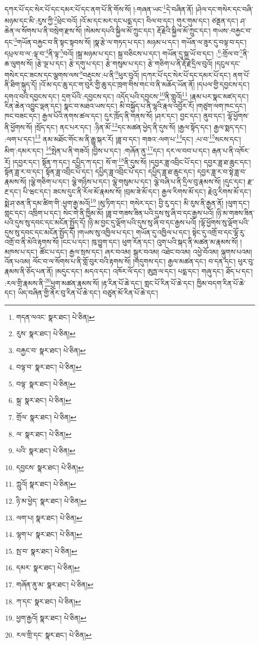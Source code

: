 དཀར་པོ་དང་སེར་པོ་དང་དམར་པོ་དང་ནག་པོ་ནི་གོས་སོ། །:གཞན་ཡང་\footnote{གདན་ལའང་  སྣར་ཐང་།  པེ་ཅིན། }དེ་བཞིན་ནོ། །ཤེལ་དང་གསེར་དང་བཞི་མཉམ་དང་མི་:རུས་ཀྱི་\footnote{རུས་  སྣར་ཐང་།  པེ་ཅིན། }ཕྲེང་བའོ། །འོ་མ་དང་མར་དང་པདྨ་དང་། བིལ་བ་དང་། གུར་གུམ་དང་། ཙནྡན་དང་། ཤ་ཆེན་ལ་སོགས་པ་ནི་བསྲེག་རྫས་སོ། །སེམས་དཔའི་སྐྱིལ་མོ་ཀྲུང་དང་། རྡོ་རྗེའི་སྐྱིལ་མོ་ཀྲུང་དང་། གཡས་:བརྐྱང་བ་དང་\footnote{བརྐྱང་བ་  སྣར་ཐང་།  པེ་ཅིན། }གཡོན་བརྐྱང་བ་ནི་སྟང་སྟབས་སོ། །སྣ་རྩེ་ལ་གཏད་པ་དང་། མཉམ་པ་དང་། གཡོན་ལ་ཟུར་དུ་བལྟ་བ་དང་། དཔྲལ་བ་ལ་:ལྟ་བ་\footnote{བལྟ་བ་  སྣར་ཐང་།  པེ་ཅིན། }ནི་ལྟ་\footnote{བལྟ་  སྣར་ཐང་།  པེ་ཅིན། }བའོ། །སྐྲ་མཉམ་པ་དང་། སྐྲ་བཅིངས་པ་དང་། གཡོན་དུ་སྐྲ་ཡོ་བ་དང་། :\footnote{སྐྲ་  སྣར་ཐང་།  པེ་ཅིན། }:གྲོལ་བ་\footnote{གྲོལ་  སྣར་ཐང་།  པེ་ཅིན། }ནི་ཆ་ལུགས་སོ། །རྩེ་ལྔ་པ་དང་། རྩེ་དགུ་པ་དང་། རྩེ་གསུམ་པ་དང་། རྩེ་གཅིག་པ་ནི་རྡོ་རྗེ་དྲིལ་བུའོ། །དངུལ་དང་གསེར་དང་ཟངས་དང་ལྕགས་ལས་\footnote{ལ་  སྣར་ཐང་།  པེ་ཅིན། }བརྡུངས་:པ་ནི་\footnote{པའི་  སྣར་ཐང་།  པེ་ཅིན། }ཕུར་བུའོ། །དཀར་པོ་དང་སེར་པོ་དང་དམར་པོ་དང་། ནག་པོ་ནི་ཐིག་སྐུད་དོ། །འོ་མ་དང་ཆུ་དང་ག་བུར་གྱི་ཆུ་དང་ཁྲག་གིས་གང་བ་ནི་མཆོད་ཡོན་ནོ། །དཔལ་གྱི་དབྱངས་དང་། དགའ་བའི་དབྱངས་དང་། དྲག་པོའི་:དབྱངས་དང་། འདོད་པའི་དབྱངས་\footnote{དབྱངས་  སྣར་ཐང་།  པེ་ཅིན། }ནི་གླུའོ།\footnote{ཀླུའོ།  སྣར་ཐང་།  པེ་ཅིན། } །རྣམ་པར་སྣང་མཛད་དང་། རིན་ཆེན་འབྱུང་ལྡན་དང་། སྣང་བ་མཐའ་ཡས་དང་། མི་བསྐྱོད་པ་ནི་ལྷའི་རྣལ་འབྱོར་རོ། །གཙུག་ལག་ཁང་དང་། ཁང་བཟང་དང་། རྒྱལ་པོའི་ནགས་ཚལ་དང་། དུར་ཁྲོད་ནི་གནས་སོ། །ཤར་དང་། བྱང་དང་། ནུབ་དང་། ལྷོ་ཕྱོགས་ནི་ཕྱོགས་སོ། །སྲོད་དང་། ནང་པར་དང་། :ཉིན་མོ་\footnote{ཉི་མ་ཕྱེད་  སྣར་ཐང་།  པེ་ཅིན། }དང་མཚན་ཕྱེད་ནི་དུས་སོ། །རྒྱལ་སྟོད་དང་། རྒྱལ་སྨད་དང་། :ལག་པ་དང་།\footnote{ལག་པ།  སྣར་ཐང་།  པེ་ཅིན། } ནམ་མཐོང་གོང་མ་ནི་རྒྱུ་སྐར་རོ། །ཟླ་བ་དང་། གཟའ་:ལག་པ་\footnote{ལྷག་པ་  སྣར་ཐང་།  པེ་ཅིན། }དང་། :པ་བ་\footnote{སྤ་བ་  སྣར་ཐང་།  པེ་ཅིན། }སངས་དང་། མིག་:དམར་དང་། \footnote{དམར་  སྣར་ཐང་།  པེ་ཅིན། }སྤེན་པ་ནི་གཟའོ། །བྱིས་པ་དང་། :གཞོན་ནུ་\footnote{གཞོན་ནུ་མ་  སྣར་ཐང་།  པེ་ཅིན། }དང་། དར་ལ་བབ་པ་དང་། རྒན་པ་ནི་འཁོར་རོ། །དབྱར་དང་། སྟོན་ཀ་དང་། དཔྱིད་ཀ་དང་། སོ་ག་\footnote{ཀ་དང་  སྣར་ཐང་།  པེ་ཅིན། }ནི་དུས་སོ། །དབྱར་ཟླ་འབྲིང་པོ་དང་། དབྱར་ཟླ་ཐ་ཆུང་དང་། སྟོན་ཟླ་ར་བ་དང་། སྟོན་ཟླ་འབྲིང་པོ་དང་། དཔྱིད་ཟླ་འབྲིང་པོ་དང་། དཔྱིད་ཟླ་ཐ་ཆུང་དང་། དབྱར་ཟླ་ར་བ་སྟེ་ཟླ་བ་རྣམས་སོ། །ལྕེ་གཅིག་པ་དང་། ལྕེ་གཉིས་པ་དང་། ལྕེ་གསུམ་པ་དང་། ལྕེ་བཞི་པ་ནི་དྲིལ་བུ་རྣམས་སོ། །དུང་དང་། རྫ་རྔ་དང་། པི་ཝང་དང་། ཟངས་དུང་ནི་རོལ་མོ་རྣམས་སོ། །བྲམ་ཟེ་མོ་དང་། རྒྱལ་རིགས་མོ་དང་། རྗེའུ་རིགས་མོ་དང་། སྨེ་ཤ་ཅན་ནི་དམ་ཚིག་གི་:ཕྱག་རྒྱ་མའོ།\footnote{ཕྱག་རྒྱའོ།  སྣར་ཐང་།  པེ་ཅིན། } །མུ་ཏིག་དང་། གསེར་དང་། བྱི་རུ་དང་། མི་རུས་ནི་རྒྱན་ནོ། །ལུག་དང་། གླང་དང་། འཁྲིག་པ་དང་། སེང་གེ་ནི་ཁྱིམ་མོ། །ཟླ་བ་གཟས་ཟིན་པའི་དུས་སུ་ཞི་བ་དང་རྒྱས་པའོ། །ཉི་མ་གཟས་ཟིན་པའི་དུས་སུ་དབང་དང་མངོན་སྤྱོད་དོ། །ཉི་མ་བྱང་དུ་ལྡོག་པའི་དུས་སུ་ཞི་བ་དང་རྒྱས་པའོ། །ལྷོ་ཕྱོགས་སུ་ལྡོག་པའི་དུས་སུ་དབང་དང་མངོན་སྤྱོད་དོ། །གཡས་སུ་འཁྱིལ་པ་དང་། གཡོན་དུ་འཁྱིལ་པ་དང་། སྟེང་དུ་འགྲོ་བ་དང་ལྷོ་རུ་འགྲོ་བ་ནི་མེའི་རྟགས་སོ། །ངང་པ་དང་། ཁུ་བྱུག་དང་། ཕུག་རོན་དང་། འུག་པའི་སྐད་ནི་མཚན་མ་རྣམས་སོ། །མཁས་པ་དང་། ཚོང་པ་དང་། རྒྱལ་སྲས་དང་། ཞར་བའམ། སྒུར་བའམ། འཐེང་བའམ། འཕྱེ་བོའམ། ལྐུགས་པའམ། འོན་པའམ། ལོང་བ་ལ་སོགས་པ་ནི་གློ་བུར་བའི་རྟགས་སོ། །གདུགས་དང་། རྒྱལ་མཚན་དང་། བ་དན་དང་། ཕུར་བུ་རྣམས་ནི་ཅོད་པན་ནོ། །མདུང་དང་། མདའ་དང་། འཁོར་ལོ་དང་། ཨུཏྤ་ལ་དང་། པདྨ་དང་། གཞུ་དང་། ཐོད་པ་དང་། :རལ་གྲི་རྣམས་ནི་\footnote{རལ་གྲི་དང་  སྣར་ཐང་།  པེ་ཅིན། }ཕྱག་མཚན་རྣམས་སོ། །རྟ་རིན་པོ་ཆེ་དང་། གླང་པོ་རིན་པོ་ཆེ་དང་། ཁྱིམ་བདག་རིན་པོ་ཆེ་དང་། ཡིད་བཞིན་གྱི་ནོར་བུ་རིན་པོ་ཆེ་དང་། བཙུན་མོ་རིན་པོ་ཆེ་དང་། 